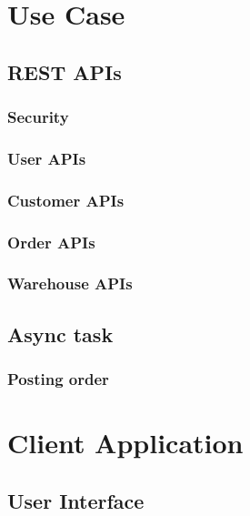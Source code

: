 \section{Use Case}
\subsection{REST APIs}
\subsubsection{Security}
\subsubsection{User APIs}
\subsubsection{Customer APIs}
\subsubsection{Order APIs}
\subsubsection{Warehouse APIs}
\subsection{Async task}
\subsubsection{Posting order}

\section{Client Application}
\subsection{User Interface}
